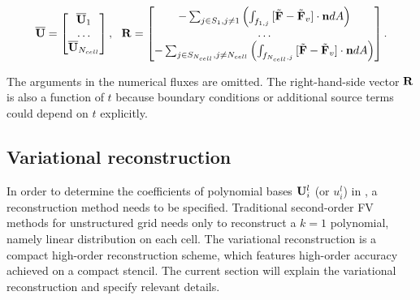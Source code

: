 \begin{equation}
    \overline{\mathbf{U}} = \begin{bmatrix}
        \overline{\mathbf{U}}_1 \\
        \dots \\
        \overline{\mathbf{U}}_{N_{cell}}
    \end{bmatrix},\ \
    \mathbf{R} = \begin{bmatrix}
        -\sum_{j\in S_1, j\neq 1}{\left(
            \int_{f_{1,j}}{
                [\tilde{\mathbf{F}} - \tilde{\mathbf{F}}_v] \cdot \mathbf{n}  dA
            }\right)
        }     \\
        \dots \\
        -\sum_{j\in S_{N_{cell}}, j\neq N_{cell}}{\left(
            \int_{f_{N_{cell},j}}{
                [\tilde{\mathbf{F}} - \tilde{\mathbf{F}}_v] \cdot \mathbf{n}  dA
            }\right)
        }
    \end{bmatrix}.
\end{equation}

The arguments in the numerical fluxes are omitted.
The right-hand-side vector $\mathbf{R}$ is also a function of $t$
because boundary conditions or additional source terms
could depend on $t$ explicitly.


\subsection{Variational reconstruction}
\label{ssec:VR}
In order to determine the coefficients of polynomial bases $\mathbf{U}_i^l$
(or $u_i^l$) in
, a reconstruction method needs to be specified.
Traditional second-order FV methods for unstructured grid
needs only to reconstruct a $k=1$ polynomial, namely linear
distribution on each cell.
The variational reconstruction \cite{wang2017compact_VR}
is a compact high-order
reconstruction scheme, which features high-order
accuracy achieved on a compact stencil.
The current section will explain the variational reconstruction
and specify relevant details.

